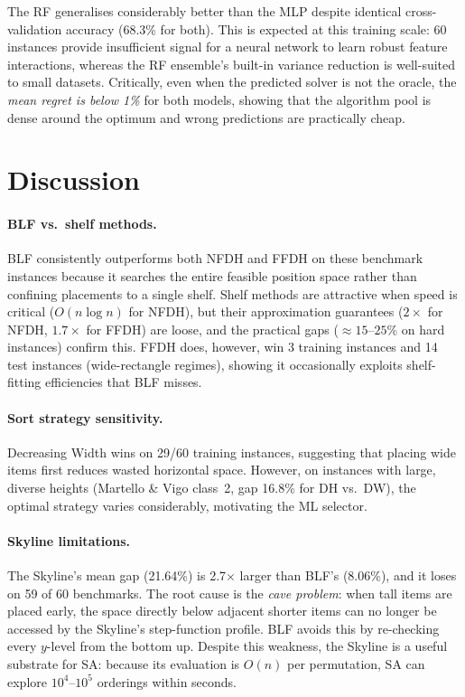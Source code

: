 \documentclass[11pt,a4paper]{article}
\begin{document}
The RF generalises considerably better than the MLP despite identical
cross-validation accuracy (68.3\% for both).
This is expected at this training scale: 60 instances provide insufficient
signal for a neural network to learn robust feature interactions, whereas the
RF ensemble's built-in variance reduction is well-suited to small datasets.
Critically, even when the predicted solver is not the oracle, the \emph{mean
regret is below 1\%} for both models, showing that the algorithm pool is
dense around the optimum and wrong predictions are practically cheap.

\section{Discussion}

\paragraph{BLF vs.\ shelf methods.}
BLF consistently outperforms both NFDH and FFDH on these benchmark instances
because it searches the entire feasible position space rather than confining
placements to a single shelf.
Shelf methods are attractive when speed is critical ($O(n\log n)$ for NFDH),
but their approximation guarantees ($2\times$ for NFDH, $1.7\times$ for FFDH)
are loose, and the practical gaps ($\approx 15$--$25\%$ on hard instances)
confirm this.
FFDH does, however, win 3 training instances and 14 test instances
(wide-rectangle regimes), showing it occasionally exploits shelf-fitting
efficiencies that BLF misses.

\paragraph{Sort strategy sensitivity.}
Decreasing Width wins on 29/60 training instances, suggesting that placing
wide items first reduces wasted horizontal space.
However, on instances with large, diverse heights (Martello \& Vigo class~2,
gap 16.8\% for DH vs.\ DW), the optimal strategy varies considerably,
motivating the ML selector.

\paragraph{Skyline limitations.}
The Skyline's mean gap (21.64\%) is 2.7$\times$ larger than BLF's (8.06\%),
and it loses on 59 of 60 benchmarks.
The root cause is the \emph{cave problem}: when tall items are placed early,
the space directly below adjacent shorter items can no longer be accessed
by the Skyline's step-function profile.
BLF avoids this by re-checking every $y$-level from the bottom up.
Despite this weakness, the Skyline is a useful substrate for SA: because its
evaluation is $O(n)$ per permutation, SA can explore $10^4$--$10^5$ orderings
within seconds.
\end{document}
